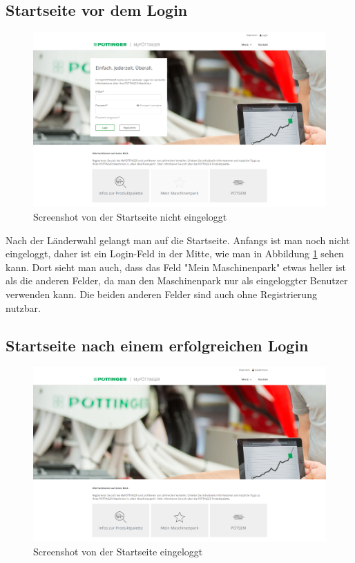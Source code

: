 \subsection{Startseite vor dem Login}
\begin{figure}[H]
	\centerline{
		\includegraphics[width=1\textwidth, frame]{./grafiken/erm_home_not_logged_in_1.png}
	}
	\vskip0pt
	\caption{Screenshot von der Startseite nicht eingeloggt} \label{fig:homeNotLoggedIn}
\end{figure}

Nach der Länderwahl gelangt man auf die Startseite. Anfangs ist man noch nicht eingeloggt, daher ist ein Login-Feld in der Mitte, wie man in Abbildung \ref{fig:homeNotLoggedIn} sehen kann. Dort sieht man auch, dass das Feld "Mein Maschinenpark" etwas heller ist als die anderen Felder, da man den Maschinenpark nur als eingeloggter Benutzer verwenden kann. Die beiden anderen Felder sind auch ohne Registrierung nutzbar.
 
\subsection{Startseite nach einem erfolgreichen Login}
\begin{figure}[H]
	\centerline{
		\includegraphics[width=1\textwidth, frame]{./grafiken/erm_home_logged_in.png}
	}
	\vskip0pt
	\caption{Screenshot von der Startseite eingeloggt} \label{fig:homeLoggedIn}
\end{figure}

